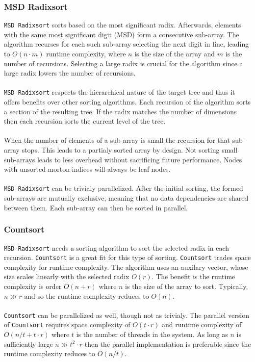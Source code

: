 \documentclass{juliacon}
\begin{document}
\subsubsection{MSD Radixsort}
\verb|MSD Radixsort| sorts based on the most significant radix. Afterwards, elements
with the same most significant digit (MSD) form a consecutive sub-array. The algorithm
recurses for each such sub-array selecting the next digit in line, leading to
$O(n\cdot m)$ runtime complexity, where $n$ is the size of the array and $m$ is
the number of recursions. Selecting a large radix is crucial for the algorithm
since a large radix lowers the number of recursions.
\\\\
\verb|MSD Radixsort| respects the hierarchical nature of the target tree and thus it offers
benefits over other sorting algorithms. Each recursion of the algorithm sorts a section
of the resulting tree. If the radix matches the number of dimensions then each recursion
sorts the current level of the tree.
\\\\
When the number of elements of a sub array is small the recursion for that sub-array stops.
This leads to a partialy sorted array by design. Not sorting small sub-arrays leads to less
overhead without sacrificing future performance. Nodes with unsorted morton indices will
always be leaf nodes.
\\\\
\verb|MSD Radixsort| can be trivialy parallelized. After the initial sorting, the formed
sub-arrays are mutually exclusive, meaning that no data dependencies are shared between
them. Each sub-array can then be sorted in parallel.

\subsubsection{Countsort}
\verb|MSD Radixsort| needs a sorting algorithm to sort the selected radix in each recursion.
\verb|Countsort| is a great fit for this type of sorting. \verb|Countsort| trades
space complexity for runtime complexity. The algorithm uses an auxilary vector, whose
size scales linearly with the selected radix $O(r)$. The benefit is the runtime
complexity is order $O(n + r)$ where $n$ is the size of the array to sort. Typically, $n \gg r$
and so the runtime complexity reduces to $O(n)$.
\\\\
\verb|Countsort| can be parallelized as well, though not as trivialy. The parallel version
of \verb|Countsort| requires space complexity of $O(t\cdot r)$ and runtime complexity of
$O(n/t + t\cdot r)$ where $t$ is the number of threads in the system. As long as $n$ is
sufficiently large $n \gg t^2\cdot r$ then the parallel implementation is preferable since
the runtime complexity reduces to $O(n/t)$.
\end{document}
